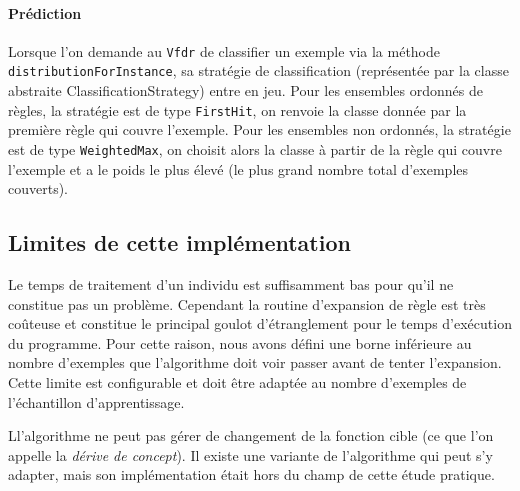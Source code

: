         \paragraph{Prédiction} Lorsque l’on demande au \texttt{Vfdr} de classifier un exemple via la méthode \texttt{distributionForInstance}, sa stratégie de classification (représentée par la classe abstraite ClassificationStrategy) entre en jeu. Pour les ensembles ordonnés de règles, la stratégie est de type \texttt{FirstHit}, on renvoie la classe donnée par la première règle qui couvre l’exemple. Pour les ensembles non ordonnés, la stratégie est de type \texttt{WeightedMax}, on choisit alors la classe à partir de la règle qui couvre l’exemple et a le poids le plus élevé (le plus grand nombre total d’exemples couverts).

    \subsection{Limites de cette implémentation}

        Le temps de traitement d'un individu est suffisamment bas pour qu'il ne constitue pas un problème. Cependant la routine d'expansion de règle est très coûteuse et constitue le principal goulot d'étranglement pour le temps d'exécution du programme. Pour cette raison, nous avons défini une borne inférieure au nombre d'exemples que l'algorithme doit voir passer avant de tenter l'expansion. Cette limite est configurable et doit être adaptée au nombre d'exemples de l'échantillon d'apprentissage.

        Ll’algorithme ne peut pas gérer de changement de la fonction cible (ce que l'on appelle la \emph{dérive de concept}). Il existe une variante de l'algorithme qui peut s'y adapter, mais son implémentation était hors du champ de cette étude pratique.